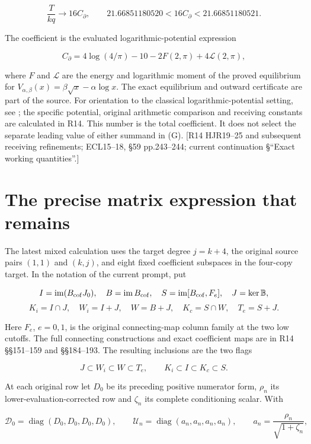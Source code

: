 \[
\frac{T}{kq}\longrightarrow16C_\partial,
\qquad21.66851180520<16C_\partial<21.66851180521.
\]

The coefficient is the evaluated logarithmic-potential expression

\[
C_\partial=4\log(4/\pi)-10-2F(2,\pi)+4\mathcal L(2,\pi),
\]

where \(F\) and \(\mathcal L\) are the energy and logarithmic moment of the proved equilibrium for \(V_{\alpha,\beta}(x)=\beta\sqrt x-\alpha\log x\). The exact equilibrium and outward certificate are part of the source. For orientation to the classical logarithmic-potential setting, see \cite{SaffTotik1997}; the specific potential, original arithmetic comparison and receiving constants are calculated in R14. This number is the total coefficient. It does not select the separate leading value of either summand in (G). {[}R14 HJR19--25 and subsequent receiving refinements; ECL15--18, §59 pp.243--244; current continuation §``Exact working quantities''.{]}

\section{The precise matrix expression that remains}\label{the-precise-matrix-expression-that-remains}

The latest mixed calculation uses the target degree \(j=k+4\), the original source pairs \((1,1)\) and \((k,j)\), and eight fixed coefficient subspaces in the four-copy target. In the notation of the current prompt, put

\[
I=\operatorname{im}(B_{\rm cof}J_0),\quad
B=\operatorname{im}B_{\rm cof},\quad
S=\operatorname{im}[B_{\rm cof},F_e],\quad J=\ker\mathbb B,
\] \[
K_i=I\cap J,\quad W_i=I+J,\quad W=B+J,\quad
K_c=S\cap W,\quad T_e=S+J.
\]

Here \(F_e\), \(e=0,1\), is the original connecting-map column family at the two low cutoffs. The full connecting constructions and exact coefficient maps are in R14 §§151--159 and §§184--193. The resulting inclusions are the two flags

\[
J\subset W_i\subset W\subset T_e,\qquad
K_i\subset I\subset K_c\subset S.
\]

At each original row let \(D_0\) be its preceding positive numerator form, \(\rho_n\) its lower-evaluation-corrected row and \(\zeta_n\) its complete conditioning scalar. With

\[
\mathcal D_0=\operatorname{diag}(D_0,D_0,D_0,D_0),\qquad
\mathcal U_n=\operatorname{diag}(a_n,a_n,a_n,a_n),
\qquad a_n=\frac{\rho_n}{\sqrt{1+\zeta_n}},
\]

